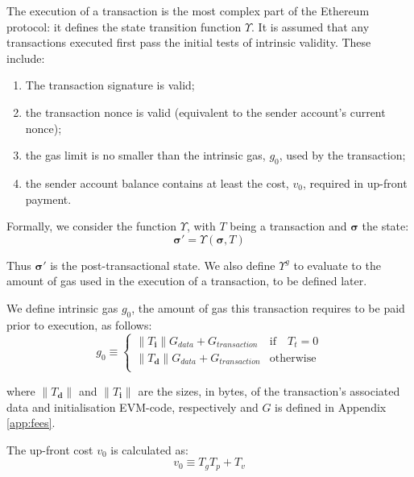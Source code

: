 \documentclass[9pt,oneside]{amsart}
\begin{document}
\begin{multicols}{2}
The execution of a transaction is the most complex part of the Ethereum protocol: it defines the state transition function $\Upsilon$. It is assumed that any transactions executed first pass the initial tests of intrinsic validity. These include:

\begin{enumerate}
\item The transaction signature is valid;
\item the transaction nonce is valid (equivalent to the sender account's current nonce);
\item the gas limit is no smaller than the intrinsic gas, $g_0$, used by the transaction;
\item the sender account balance contains at least the cost, $v_0$, required in up-front payment.
\end{enumerate}

Formally, we consider the function $\Upsilon$, with $T$ being a transaction and $\boldsymbol{\sigma}$ the state:
\begin{equation}
\boldsymbol{\sigma}' = \Upsilon(\boldsymbol{\sigma}, T)
\end{equation}

Thus $\boldsymbol{\sigma}'$ is the post-transactional state. We also define $\Upsilon^g$ to evaluate to the amount of gas used in the execution of a transaction, to be defined later.

We define intrinsic gas $g_0$, the amount of gas this transaction requires to be paid prior to execution, as follows:
\begin{equation}
g_0 \equiv \begin{cases}
\lVert T_\mathbf{i}\rVert G_{data} + G_{transaction} & \text{if} \quad T_t = 0 \\
\lVert T_\mathbf{d}\rVert G_{data} + G_{transaction} & \text{otherwise} \\
\end{cases}
\end{equation}

where $\lVert T_\mathbf{d}\rVert$ and $\lVert T_\mathbf{i}\rVert$ are the sizes, in bytes, of the transaction's associated data and initialisation EVM-code, respectively and $G$ is defined in Appendix \ref{app:fees}.


The up-front cost $v_0$ is calculated as:
\begin{equation}
v_0 \equiv T_g T_p + T_v
\end{equation}


\end{multicols}
\end{document}
